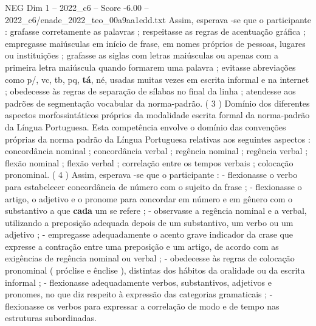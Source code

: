 \begin{textsample}{NEG Dim 1 – 2022\_c6 – Score -6.00 – 2022\_c6/enade\_2022\_teo\_00a9aa1edd.txt}
Assim, esperava -se que o participante : grafasse corretamente as palavras ; respeitasse as regras de acentuação gráfica ; empregasse maiúsculas em início de frase, em nomes próprios de pessoas, lugares ou instituições ; grafasse as siglas com letras maiúsculas ou apenas com a primeira letra maiúscula quando formarem uma palavra ; evitasse abreviações como p/, vc, tb, pq, \textbf{tá}, né, usadas muitas vezes em escrita informal e na internet ; obedecesse às regras de separação de sílabas no final da linha ; atendesse aos padrões de segmentação vocabular da norma-padrão. ( 3 ) Domínio dos diferentes aspectos morfossintáticos próprios da modalidade escrita formal da norma-padrão da Língua Portuguesa.
Esta competência envolve o domínio das convenções próprias da norma padrão da Língua Portuguesa relativas aos seguintes aspectos : concordância nominal ; concordância verbal ; regência nominal ; regência verbal ; flexão nominal ; flexão verbal ; correlação entre os tempos verbais ; colocação pronominal. ( 4 ) Assim, esperava -se que o participante : - flexionasse o verbo para estabelecer concordância de número com o sujeito da frase ; - flexionasse o artigo, o adjetivo e o pronome para concordar em número e em gênero com o substantivo a que \textbf{cada} um se refere ; - observasse a regência nominal e a verbal, utilizando a preposição adequada depois de um substantivo, um verbo ou um adjetivo ; - empregasse adequadamente o acento grave indicador da crase que expresse a contração entre uma preposição e um artigo, de acordo com as exigências de regência nominal ou verbal ; - obedecesse às regras de colocação pronominal ( próclise e ênclise ), distintas dos hábitos da oralidade ou da escrita informal ; - flexionasse adequadamente verbos, substantivos, adjetivos e pronomes, no que diz respeito à expressão das categorias gramaticais ; - flexionasse os verbos para expressar a correlação de modo e de tempo nas estruturas subordinadas.

\end{textsample}
